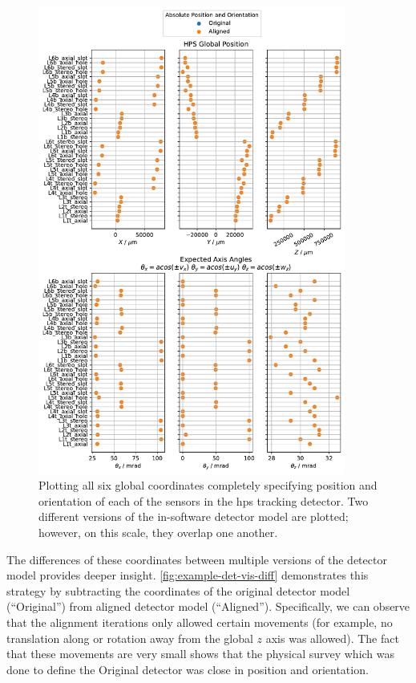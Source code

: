 \begin{figure}
  \centering
  \includegraphics[width=0.9\textwidth]{figures/hps/alignment/example-det-vis-abs.pdf}
  \caption{Plotting all six global coordinates completely specifying position and orientation
    of each of the sensors in the \ac{hps} tracking detector. Two different versions of the
    in-software detector model are plotted; however, on this scale, they overlap one another.}
  \label{fig:example-det-vis-abs}
\end{figure}

The differences of these coordinates between multiple versions of the detector model
provides deeper insight.
\cref{fig:example-det-vis-diff} demonstrates this strategy by subtracting
the coordinates of the original detector model (``Original'') from aligned detector model (``Aligned'').
Specifically, we can observe that the alignment iterations only allowed certain movements
(for example, no translation along or rotation away from the global $z$ axis was allowed).
The fact that these movements are very small shows that the physical survey which was done
to define the Original detector was close in position and orientation.

